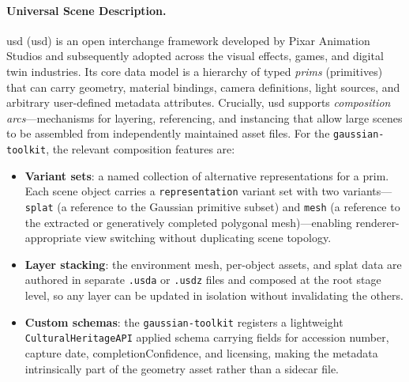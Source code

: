 \paragraph{Universal Scene Description.}
\acrlong{usd} (\acrshort{usd}) \parencite{Pixar2019} is an open interchange
framework developed by Pixar Animation Studios and subsequently adopted across the
visual effects, games, and digital twin industries. Its core data model is a
hierarchy of typed \emph{prims} (primitives) that can carry geometry, material
bindings, camera definitions, light sources, and arbitrary user-defined metadata
attributes. Crucially, \acrshort{usd} supports \emph{composition arcs}---mechanisms
for layering, referencing, and instancing that allow large scenes to be assembled
from independently maintained asset files. For the \texttt{gaussian-toolkit}, the
relevant composition features are:

\begin{itemize}
  \item \textbf{Variant sets}: a named collection of alternative representations
    for a prim. Each scene object carries a \texttt{representation} variant set
    with two variants---\texttt{splat} (a reference to the Gaussian primitive
    subset) and \texttt{mesh} (a reference to the extracted or generatively
    completed polygonal mesh)---enabling renderer-appropriate view switching
    without duplicating scene topology.

  \item \textbf{Layer stacking}: the environment mesh, per-object assets, and
    splat data are authored in separate \texttt{.usda} or \texttt{.usdz} files
    and composed at the root stage level, so any layer can be updated in isolation
    without invalidating the others.

  \item \textbf{Custom schemas}: the \texttt{gaussian-toolkit} registers a
    lightweight \texttt{CulturalHeritageAPI} applied schema carrying fields for
    accession number, capture date, completionConfidence, and licensing, making
    the metadata intrinsically part of the geometry asset rather than a sidecar file.
\end{itemize}

